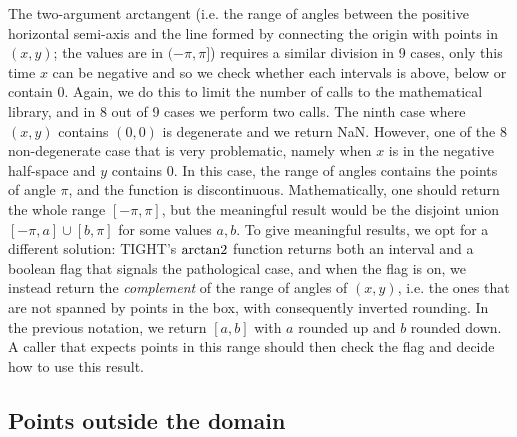 The two-argument arctangent (i.e. the range of angles between the positive horizontal semi-axis and the line formed by connecting the origin with points in $(x,y)$; the values are in $(-\pi,\pi]$) requires a similar division in 9 cases, only this time $x$ can be negative and so we check whether each intervals is above, below or contain 0.
Again, we do this to limit the number of calls to the mathematical library, and in 8 out of 9 cases we perform two calls. The ninth case where $(x,y)$ contains $(0,0)$ is degenerate and we return NaN.
However, one of the 8 non-degenerate case that is very problematic, namely when $x$ is in the negative half-space and $y$ contains 0. In this case, the range of angles contains the points of angle $\pi$, and the function is discontinuous. Mathematically, one should return the whole range $[-\pi,\pi]$, but the meaningful result would be the disjoint union $[-\pi, a]\cup[b, \pi]$ for some values $a,b$.
To give meaningful results, we opt for a different solution: TIGHT's $\operatorname{arctan2}$ function returns both an interval and a boolean flag that signals the pathological case, and when the flag is on, we instead return the \emph{complement} of the range of angles of $(x,y)$, i.e. the ones that are not spanned by points in the box, with consequently inverted rounding. In the previous notation, we return $[a,b]$ with $a$ rounded up and $b$ rounded down. A caller that expects points in this range should then check the flag and decide how to use this result.

\subsection{Points outside the domain}
